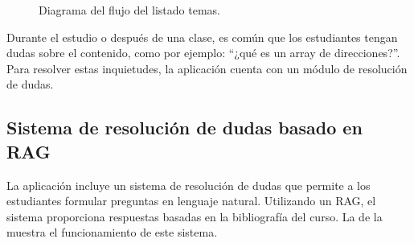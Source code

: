 \begin{figure}[h!]
  \centering
\caption{Diagrama del flujo del listado temas.}\label{fig:topics}
\end{figure}

Durante el estudio o después de una clase, es común que los estudiantes tengan dudas sobre el contenido, como por ejemplo: ``¿qué es un array de direcciones?''. Para resolver estas inquietudes, la aplicación cuenta con un módulo de resolución de dudas.

\subsection{Sistema de resolución de dudas basado en RAG}

La aplicación incluye un sistema de resolución de dudas que permite a los estudiantes formular preguntas en lenguaje natural. Utilizando un RAG, el sistema proporciona respuestas basadas en la bibliografía del curso. La  de la  muestra el funcionamiento de este sistema.

